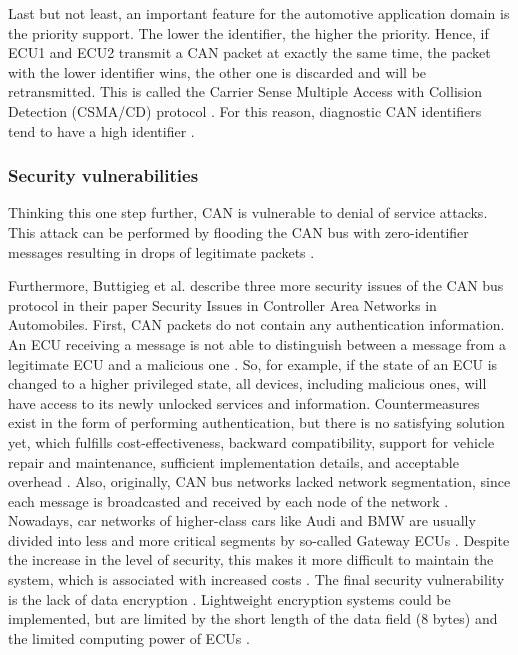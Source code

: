 Last but not least, an important feature for the automotive application domain is the priority support. The lower the identifier, the higher the priority. Hence, if ECU1 and ECU2 transmit a CAN packet at exactly the same time, the packet with the lower identifier wins, the other one is discarded and will be retransmitted. This is called the Carrier Sense Multiple Access with Collision Detection (CSMA/CD) protocol \cite{Sharma2016}. For this reason, diagnostic CAN identifiers tend to have a high identifier \cite{Herrewegen2018}.

\subsubsection{Security vulnerabilities}

Thinking this one step further, CAN is vulnerable to denial of service attacks. This attack can be performed by flooding the CAN bus with zero-identifier messages resulting in drops of legitimate packets \cite{Buttigieg2017}.

Furthermore, Buttigieg et al. \cite{Buttigieg2017} describe three more security issues of the CAN bus protocol in their paper {Security Issues in Controller Area Networks in Automobiles}.
First, CAN packets do not contain any authentication information. An ECU receiving a message is not able to distinguish between a message from a legitimate ECU and a malicious one \cite{Buttigieg2017}. So, for example, if the state of an ECU is changed to a higher privileged state, all devices, including malicious ones, will have access to its newly unlocked services and information. Countermeasures exist in the form of performing authentication, but there is no satisfying solution yet, which fulfills cost-effectiveness, backward compatibility, support for vehicle repair and maintenance, sufficient implementation details, and acceptable overhead \cite{Bozdal2020}.
Also, originally, CAN bus networks lacked network segmentation, since each message is broadcasted and received by each node of the network \cite{Buttigieg2017}. Nowadays, car networks of higher-class cars like Audi and BMW are usually divided into less and more critical segments by so-called Gateway ECUs \cite{Bozdal2020}. Despite the increase in the level of security, this makes it more difficult to maintain the system, which is associated with increased costs \cite{Bozdal2020}.
The final security vulnerability is the lack of data encryption \cite{Buttigieg2017}. Lightweight encryption systems could be implemented, but are limited by the short length of the data field (8 bytes) and the limited computing power of ECUs \cite{Bozdal2020}.

